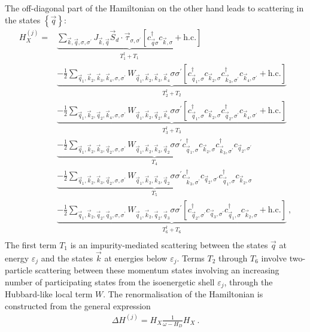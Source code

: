 \documentclass{revtex4-2}
\begin{document}
The off-diagonal part of the Hamiltonian on the other hand leads to scattering in the states \(\left\{ \vec q \right\} \):
\begin{equation}\begin{aligned}
	H_X^{(j)} =& \underbrace{\sum_{\vec k, \vec q, \sigma,\sigma^\prime}J_{\vec k, \vec q} \vec{S}_d\cdot\vec{\tau}_{\sigma,\sigma^\prime}\left[c^\dagger_{\vec q\sigma}c_{\vec k,\sigma} + \text{h.c.}\right]}_{T_1^\dagger + T_1} \\
		   &\underbrace{- \frac{1}{2}\sum_{\vec q_1,\vec k_2, \vec k_3, \vec k_4,\sigma,\sigma^\prime}W_{\vec q_1,\vec k_2,\vec k_3,\vec k_4} \sigma\sigma^\prime \left[c^\dagger_{\vec q_1,\sigma}c_{\vec k_2,\sigma}c^\dagger_{\vec k_3,\sigma^\prime}c_{\vec k_4,\sigma^\prime} + \text{h.c.}\right]}_{T_2^\dagger + T_2}\\
		   &\underbrace{- \frac{1}{2}\sum_{\vec q_1,\vec k_2, \vec q_2, \vec k_4,\sigma,\sigma^\prime}W_{\vec q_1,\vec k_2, \vec q_2, \vec k_4} \sigma\sigma^\prime \left[c^\dagger_{\vec q_1,\sigma}c_{\vec k_2,\sigma}c^\dagger_{\vec q_2,\sigma^\prime}c_{\vec k_4,\sigma^\prime} + \text{h.c.}\right]}_{T_3^\dagger + T_3}\\
		   &\underbrace{- \frac{1}{2}\sum_{\vec q_1,\vec k_2,\vec k_3,\vec q_2,\sigma,\sigma^\prime}W_{\vec q_1,\vec k_2,\vec k_3,\vec q_2} \sigma\sigma^\prime c^\dagger_{\vec q_1,\sigma}c_{\vec k_2,\sigma}c^\dagger_{\vec k_3,\sigma^\prime}c_{\vec q_2,\sigma^\prime}}_{T_4}\\
		   &\underbrace{- \frac{1}{2}\sum_{\vec q_1,\vec k_2,\vec k_3,\vec q_2,\sigma,\sigma^\prime}W_{\vec q_1,\vec k_2,\vec k_3,\vec q_2} \sigma\sigma^\prime c^\dagger_{\vec k_3,\sigma^\prime}c_{\vec q_2,\sigma^\prime}c^\dagger_{\vec q_1,\sigma}c_{\vec k_2,\sigma}}_{T_5}\\
		   &\underbrace{- \frac{1}{2}\sum_{\vec q_1,\vec k_2, \vec q_2, \vec q_3,\sigma,\sigma^\prime}W_{\vec q_1,\vec k_2, \vec q_2, \vec q_3} \sigma\sigma^\prime \left[c^\dagger_{\vec q_2,\sigma^\prime}c_{\vec q_3,\sigma^\prime}c^\dagger_{\vec q_1,\sigma}c_{\vec k_2,\sigma} + \text{h.c.}\right]}_{T_6^\dagger + T_6}~,\\
\end{aligned}\end{equation}
The first term \(T_1\) is an impurity-mediated scattering between the states \(\vec q\) at energy \(\varepsilon_j\) and the states \(\vec k\) at energies below \(\varepsilon_j\). Terms \(T_2\) through \(T_6\) involve two-particle scattering between these momentum states involving an increasing number of participating states from the isoenergetic shell \(\varepsilon_j\), through the Hubbard-like local term \(W\). The renormalisation of the Hamiltonian is constructed from the general expression
\begin{equation}\begin{aligned}
	\Delta H^{(j)} = H_X \frac{1}{\omega- H_D} H_X~.
\end{aligned}\end{equation}
\end{document}
